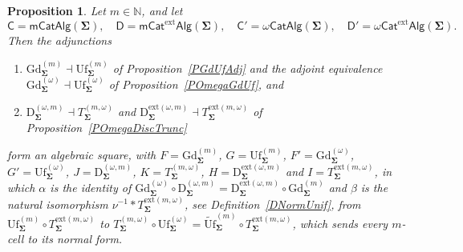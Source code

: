 \documentclass{amsart}
\theoremstyle{plain}
\newtheorem{proposition}[theorem]{Proposition}
\theoremstyle{definition}
\begin{document}
\begin{proposition}\label{PAlgSquareOmega}
Let $m\in\mathbb{N}$, and let
$$
\mathsf{C}=\mathsf{mCatAlg}(\mathbf{\Sigma}),\quad
\mathsf{D}=\mathsf{mCat}^{\mathrm{ext}}\mathsf{Alg}(\mathbf{\Sigma}),\quad
\mathsf{C}'=\omega\mathsf{CatAlg}(\mathbf{\Sigma}),\quad
\mathsf{D}'=\omega\mathsf{Cat}^{\mathrm{ext}}\mathsf{Alg}(\mathbf{\Sigma}).
$$
Then the adjunctions
\begin{enumerate}
\item $\mathrm{Gd}^{(m)}_{\mathbf{\Sigma}}\dashv\mathrm{Uf}^{(m)}_{\mathbf{\Sigma}}$ of Proposition~\ref{PGdUfAdj} and the adjoint equivalence $\mathrm{Gd}^{(\omega)}_{\mathbf{\Sigma}}\dashv\mathrm{Uf}^{(\omega)}_{\mathbf{\Sigma}}$ of Proposition~\ref{POmegaGdUf}, and
\item $\mathrm{D}^{(\omega,m)}_{\mathbf{\Sigma}}\dashv T^{(m,\omega)}_{\mathbf{\Sigma}}$ and $\mathrm{D}^{\mathrm{ext}(\omega,m)}_{\mathbf{\Sigma}}\dashv T^{\mathrm{ext}(m,\omega)}_{\mathbf{\Sigma}}$ of Proposition~\ref{POmegaDiscTrunc}
\end{enumerate}
form an algebraic square, with $F=\mathrm{Gd}^{(m)}_{\mathbf{\Sigma}}$, $G=\mathrm{Uf}^{(m)}_{\mathbf{\Sigma}}$, $F'=\mathrm{Gd}^{(\omega)}_{\mathbf{\Sigma}}$, $G'=\mathrm{Uf}^{(\omega)}_{\mathbf{\Sigma}}$, $J=\mathrm{D}^{(\omega,m)}_{\mathbf{\Sigma}}$, $K=T^{(m,\omega)}_{\mathbf{\Sigma}}$, $H=\mathrm{D}^{\mathrm{ext}(\omega,m)}_{\mathbf{\Sigma}}$ and $I=T^{\mathrm{ext}(m,\omega)}_{\mathbf{\Sigma}}$, in which $\alpha$ is the identity of $\mathrm{Gd}^{(\omega)}_{\mathbf{\Sigma}}\circ\mathrm{D}^{(\omega,m)}_{\mathbf{\Sigma}}=\mathrm{D}^{\mathrm{ext}(\omega,m)}_{\mathbf{\Sigma}}\circ\mathrm{Gd}^{(m)}_{\mathbf{\Sigma}}$ and $\beta$ is the natural isomorphism $\nu^{-1}\ast T^{\mathrm{ext}(m,\omega)}_{\mathbf{\Sigma}}$, see Definition~\ref{DNormUnif}, from $\mathrm{Uf}^{(m)}_{\mathbf{\Sigma}}\circ T^{\mathrm{ext}(m,\omega)}_{\mathbf{\Sigma}}$ to $T^{(m,\omega)}_{\mathbf{\Sigma}}\circ\mathrm{Uf}^{(\omega)}_{\mathbf{\Sigma}}=\widetilde{\mathrm{Uf}}^{(m)}_{\mathbf{\Sigma}}\circ T^{\mathrm{ext}(m,\omega)}_{\mathbf{\Sigma}}$, which sends every $m$-cell to its normal form.
\end{proposition}
\end{document}
